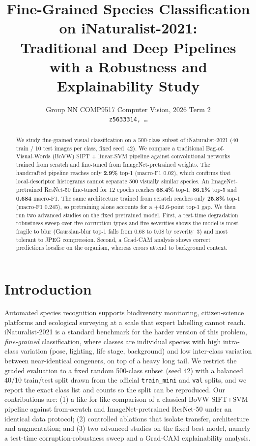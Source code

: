\documentclass[10pt,twocolumn,letterpaper]{article}
\begin{document}
\title{Fine-Grained Species Classification on iNaturalist-2021:\\
Traditional and Deep Pipelines with a Robustness and Explainability Study}
\author{Group NN \quad COMP9517 Computer Vision, 2026 Term 2\\
{\tt\small z5633314, \dots}}
\maketitle

\begin{abstract}
We study fine-grained visual classification on a 500-class subset of
iNaturalist-2021 (40 train / 10 test images per class, fixed seed~42). We compare a
traditional Bag-of-Visual-Words (BoVW) SIFT + linear-SVM pipeline against
convolutional networks trained from scratch and fine-tuned from ImageNet-pretrained
weights. The handcrafted pipeline reaches only \textbf{2.9\%} top-1 (macro-F1 0.02),
which confirms that local-descriptor histograms cannot separate 500 visually similar
species. An ImageNet-pretrained ResNet-50 fine-tuned for 12 epochs reaches
\textbf{68.4\%} top-1, \textbf{86.1\%} top-5 and \textbf{0.684} macro-F1. The same
architecture trained from scratch reaches only \textbf{25.8\%} top-1 (macro-F1 0.245),
so pretraining alone accounts for a $+42.6$-point top-1 gap. We then run
two advanced studies on the fixed pretrained model. First, a test-time degradation
robustness sweep over five corruption types and five severities shows the model
is most fragile to blur (Gaussian-blur top-1 falls from 0.68 to 0.08 by severity~3)
and most tolerant to JPEG compression. Second, a Grad-CAM analysis shows correct
predictions localise on the organism, whereas errors attend to background context.
\end{abstract}

\section{Introduction}\label{sec:intro}
Automated species recognition supports biodiversity monitoring, citizen-science
platforms and ecological surveying at a scale that expert labelling cannot reach.
iNaturalist-2021 is a standard benchmark for the harder version of this problem,
\emph{fine-grained} classification, where classes are individual species with high
intra-class variation (pose, lighting, life stage, background) and low inter-class
variation between near-identical congeners, on top of a heavy long tail. We restrict the
graded evaluation to a fixed random 500-class subset (seed 42) with a balanced
40/10 train/test split drawn from the official \texttt{train\_mini} and \texttt{val}
splits, and we report the exact class list and counts so the split can be reproduced.
Our contributions are: (1) a like-for-like comparison of a classical BoVW-SIFT+SVM
pipeline against from-scratch and ImageNet-pretrained ResNet-50 under an identical
data protocol; (2) controlled ablations that isolate transfer, architecture and
augmentation; and (3) two advanced studies on the fixed best model, namely a
test-time corruption-robustness sweep and a Grad-CAM explainability analysis.
\end{document}
